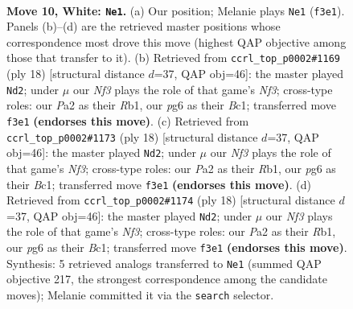 \documentclass[11pt]{article}
\begin{document}
\begin{figure}[p]
\label{fig:thought-m16}
\end{figure}

\clearpage

\begin{figure}[p]\centering
\begin{subfigure}{0.46\textwidth}\centering
\resizebox{\linewidth}{!}{%
\newchessgame
\chessboard[
  setfen={r1bq1rk1/pp3pb1/2np1np1/2p1p2p/2P4P/BPN2NP1/P2PPPB1/R2Q1RK1 w - - 0 10},
  showmover=false,
  pgfstyle=straightmove, color=movearrow, markmove={f3-e1}
]}
\caption{}
\end{subfigure}\hfill
\begin{subfigure}{0.46\textwidth}\centering
\resizebox{\linewidth}{!}{%
\newchessgame
\chessboard[
  setfen={r1bq1rk1/1pp2pb1/p1np1npp/4p3/1PP5/2NP1NP1/P3PPBP/1RBQ1RK1 w - - 0 10},
  showmover=false,
  pgfstyle=straightmove, color=movearrow, markmove={f3-d2}
]}
\caption{}
\end{subfigure}
\\[4pt]
\begin{subfigure}{0.46\textwidth}\centering
\resizebox{\linewidth}{!}{%
\newchessgame
\chessboard[
  setfen={r1bq1rk1/1pp2pb1/p1np1npp/4p3/1PP5/2NP1NP1/P3PPBP/1RBQ1RK1 w - - 0 10},
  showmover=false,
  pgfstyle=straightmove, color=movearrow, markmove={f3-d2}
]}
\caption{}
\end{subfigure}\hfill
\begin{subfigure}{0.46\textwidth}\centering
\resizebox{\linewidth}{!}{%
\newchessgame
\chessboard[
  setfen={r1bq1rk1/1pp2pb1/p1np1npp/4p3/1PP5/2NP1NP1/P3PPBP/1RBQ1RK1 w - - 0 10},
  showmover=false,
  pgfstyle=straightmove, color=movearrow, markmove={f3-d2}
]}
\caption{}
\end{subfigure}
\caption{\textbf{Move 10, White: \texttt{Ne1}.} (a) Our position; Melanie plays \texttt{Ne1} (\texttt{f3e1}). Panels (b)--(d) are the retrieved master positions whose correspondence most drove this move (highest QAP objective among those that transfer to it). (b) Retrieved from \texttt{ccrl\_top\_p0002\#1169} (ply 18) [structural distance $d$=37, QAP obj=46]: the master played \texttt{Nd2}; under $\mu$ our \emph{Nf3} plays the role of that game's \emph{Nf3}; cross-type roles: our \emph{P}a2 as their \emph{R}b1, our \emph{p}g6 as their \emph{B}c1; transferred move \texttt{f3e1} \textbf{(endorses this move)}. (c) Retrieved from \texttt{ccrl\_top\_p0002\#1173} (ply 18) [structural distance $d$=37, QAP obj=46]: the master played \texttt{Nd2}; under $\mu$ our \emph{Nf3} plays the role of that game's \emph{Nf3}; cross-type roles: our \emph{P}a2 as their \emph{R}b1, our \emph{p}g6 as their \emph{B}c1; transferred move \texttt{f3e1} \textbf{(endorses this move)}. (d) Retrieved from \texttt{ccrl\_top\_p0002\#1174} (ply 18) [structural distance $d$=37, QAP obj=46]: the master played \texttt{Nd2}; under $\mu$ our \emph{Nf3} plays the role of that game's \emph{Nf3}; cross-type roles: our \emph{P}a2 as their \emph{R}b1, our \emph{p}g6 as their \emph{B}c1; transferred move \texttt{f3e1} \textbf{(endorses this move)}. Synthesis: 5 retrieved analogs transferred to \texttt{Ne1} (summed QAP objective 217, the strongest correspondence among the candidate moves); Melanie committed it via the \texttt{search} selector.}

\end{figure}
\end{document}

